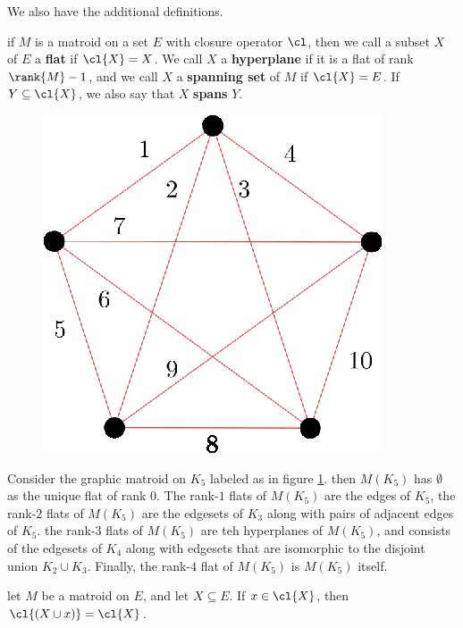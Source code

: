 We also have the additional definitions.

\begin{definition}
    if $M$ is a matroid on a set  $E$ with closure operator $\cl$, then we call
    a subset $X$ of  $E$ a  \textbf{flat} if $\cl{X}=X$. We call $X$ a
    \textbf{hyperplane} if it is a flat of rank $\rank{M}-1$, and we call $X$ a
     \textbf{spanning set} of $M$ if  $\cl{X}=E$. If $Y \subseteq \cl{X}$, we
     also say that $X$  \textbf{spans} $Y$.
\end{definition}

\begin{example}\label{1.15}
    \begin{figure}[h]
        \centering
        \includegraphics[scale=1.0]{Figures/chapter1/closure_K_5.eps}
        \caption{}
        \label{fig_1.7}
    \end{figure}
    Consider the graphic matroid on $K_5$ labeled as in figure \ref{fig_1.7}.
    then $M(K_5)$ has $\emptyset$ as the unique flat of rank  $0$. The rank-$1$
    flats of $M(K_5)$ are the edges of $K_5$, the rank-$2$ flats of $M(K_5)$ are
    the edgesets of  $K_3$ along with pairs of adjacent edges of $K_5$. the
    rank-$3$ flats of $M(K_5)$ are teh hyperplanes of  $M(K_5)$, and consists of
    the edgesets of  $K_4$ along with edgesets that are isomorphic to the
    disjoint union $K_2 \cup K_3$. Finally, the rank-$4$ flat of $M(K_5)$ is
    $M(K_5)$ itself.
\end{example}

\begin{lemma}\label{1.4.6}
    let $M$ be a matroid on  $E$, and let  $X \subseteq E$. If  $x \in \cl{X}$,
    then $\cl{(X \cup x)}=\cl{X}$.
\end{lemma}

